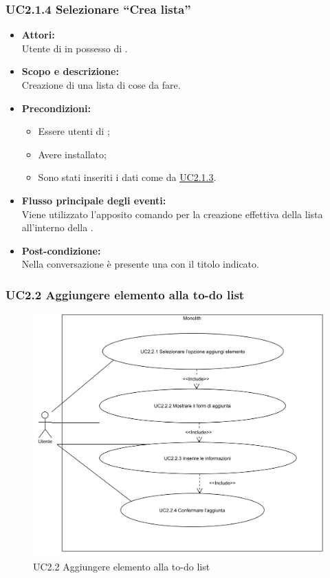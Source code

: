 \subsubsection{UC2.1.4 Selezionare “Crea lista”} \label{UC2.1.4}

\begin{itemize}
	\item \textbf{Attori:}
	\\Utente di  in possesso di \ProjectName{}.
	\item \textbf{Scopo e descrizione:} 
	\\Creazione di una lista di cose da fare.
	\item \textbf{Precondizioni:}
	\begin{itemize}
		\item Essere utenti di ;
		\item Avere \ProjectName{} installato;
		\item Sono stati inseriti i dati come da \hyperref[UC2.1.3]{UC2.1.3}.
	\end{itemize}
	\item \textbf{Flusso principale degli eventi:}
	\\Viene utilizzato l'apposito comando per la creazione effettiva della lista all'interno della .
	\item \textbf{Post-condizione:}
	\\Nella conversazione è presente una   con il titolo indicato. 
\end{itemize}

\subsubsection{UC2.2 Aggiungere elemento alla to-do list} \label{UC2.2}

\begin{figure}[H]
	\centering
	\includegraphics[width=15cm]{../../documenti/AnalisiDeiRequisiti/Diagrammi_img/uc2_2.png}
	\caption{UC2.2 Aggiungere elemento alla to-do list}
\end{figure}

